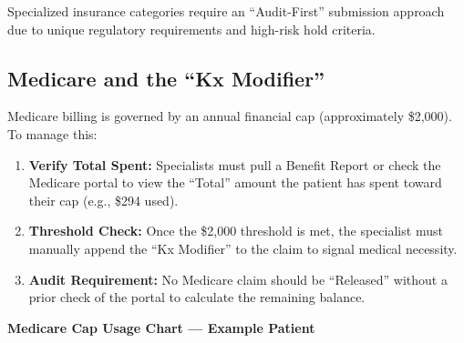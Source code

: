 \documentclass[11pt,a4paper]{article}
\begin{document}
Specialized insurance categories require an ``Audit-First'' submission approach due to unique regulatory requirements and high-risk hold criteria.

\subsection{Medicare and the ``Kx Modifier''}

Medicare billing is governed by an annual financial cap (approximately \$2{,}000). To manage this:

\begin{enumerate}
  \item \textbf{Verify Total Spent:} Specialists must pull a Benefit Report or check the Medicare portal to view the ``Total'' amount the patient has spent toward their cap (e.g., \$294 used).
  \item \textbf{Threshold Check:} Once the \$2{,}000 threshold is met, the specialist must manually append the ``Kx Modifier'' to the claim to signal medical necessity.
  \item \textbf{Audit Requirement:} No Medicare claim should be ``Released'' without a prior check of the portal to calculate the remaining balance.
\end{enumerate}

\vspace{0.3em}
\begin{center}
\textbf{\color{AccentTeal}Medicare Cap Usage Chart --- Example Patient}\\[0.4em]
\end{center}
\end{document}
